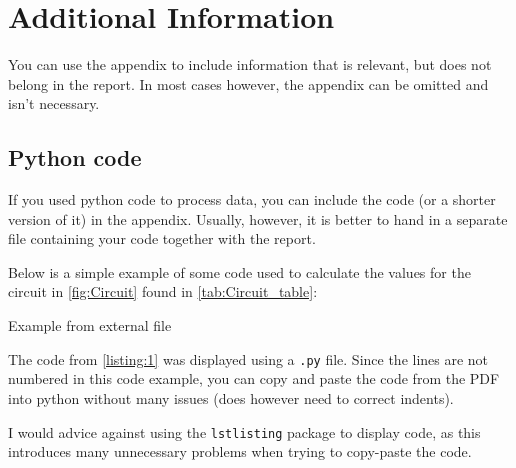 \appendix


\section{Additional Information}

You can use the appendix to include information that is relevant, but does not belong in the report. In most cases however, the appendix can be omitted and isn't necessary. \par
\subsection{Python code}
If you used python code to process data, you can include the code (or a shorter version of it) in the appendix. Usually, however, it is better to hand in a separate file containing your code together with the report.
 \par

Below is a simple example of some code used to calculate the values for the circuit in \vref{fig:Circuit} 
found in \cref{tab:Circuit_table}:

\begin{listing}[!htb]


\caption{Example from external file}
\label{listing:1}
\end{listing}

The code from \cref{listing:1} was displayed using a \verb+.py+ file. Since the lines are not numbered in this code example, you can copy and paste the code from the PDF into python without many issues (does however need to correct indents). \par
I would advice against using the \verb+lstlisting+ package to display code, as this introduces many unnecessary problems when trying to copy-paste the code.\par


